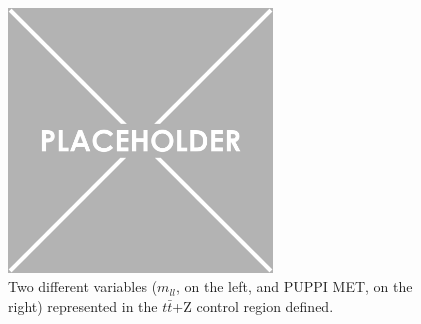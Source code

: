\documentclass[a4paper, 10pt, openright]{report}
\begin{document}
\begin{figure}[htbp]
{\begin{minipage}[b]{.48\textwidth}
\end{minipage}\hfill
\begin{minipage}[b]{.48\textwidth}
\includegraphics[width=7cm, height=7cm]{figs/placeholder.png}
\end{minipage} \hfill
}
\caption{Two different variables ($m_{ll}$, on the left, and \ac{PUPPI} \ac{MET}, on the right) represented in the $t \bar t$+Z control region defined.}
\label{fig:ttZCR}
\end{figure}
\end{document}
